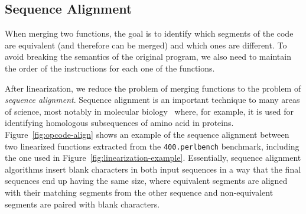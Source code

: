 
\subsection{Sequence Alignment}

When merging two functions, the goal is to identify which segments of the code are equivalent (and therefore can be merged) and which ones are different.
To avoid breaking the semantics of the original program, we also need to maintain the order of the instructions for each one of the functions.

After linearization, we reduce the problem of merging functions to the problem of \textit{sequence alignment}. Sequence alignment is an important technique to many areas of science, most notably in molecular biology~\cite{needleman70,smith81,carrillo88,wang94} where, for
example, it is used for identifying homologous subsequences of amino acid in proteins. Figure~\ref{fig:opcode-align} shows an example of
the sequence alignment between two linearized functions extracted from the \texttt{400.perlbench} benchmark, including the one used in
Figure~\ref{fig:linearization-example}.
Essentially, sequence alignment algorithms insert blank characters in both input sequences in a way that
the final sequences end up having the same size, where equivalent segments are aligned with their matching segments from the other sequence
and non-equivalent segments are paired with blank characters.

